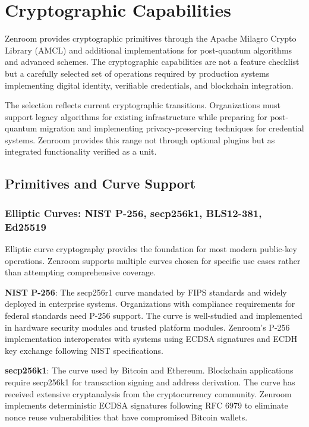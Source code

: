 \section{Cryptographic Capabilities}

Zenroom provides cryptographic primitives through the Apache Milagro
Crypto Library (AMCL) and additional implementations for post-quantum
algorithms and advanced schemes. The cryptographic capabilities are
not a feature checklist but a carefully selected set of operations
required by production systems implementing digital identity,
verifiable credentials, and blockchain integration.

The selection reflects current cryptographic
transitions. Organizations must support legacy algorithms for existing
infrastructure while preparing for post-quantum migration and
implementing privacy-preserving techniques for credential
systems. Zenroom provides this range not through optional plugins but
as integrated functionality verified as a unit.

\subsection{Primitives and Curve Support}

\subsubsection{Elliptic Curves: NIST P-256, secp256k1, BLS12-381, Ed25519}

Elliptic curve cryptography provides the foundation for most modern
public-key operations. Zenroom supports multiple curves chosen for
specific use cases rather than attempting comprehensive coverage.

\textbf{NIST P-256}: The secp256r1 curve mandated by FIPS standards
and widely deployed in enterprise systems. Organizations with
compliance requirements for federal standards need P-256 support. The
curve is well-studied and implemented in hardware security modules and
trusted platform modules. Zenroom's P-256 implementation interoperates
with systems using ECDSA signatures and ECDH key exchange following
NIST specifications.

\textbf{secp256k1}: The curve used by Bitcoin and Ethereum. Blockchain
applications require secp256k1 for transaction signing and address
derivation. The curve has received extensive cryptanalysis from the
cryptocurrency community. Zenroom implements deterministic ECDSA
signatures following RFC 6979 to eliminate nonce reuse vulnerabilities
that have compromised Bitcoin wallets.

